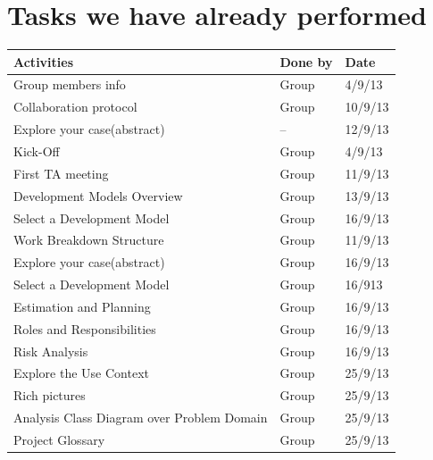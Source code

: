 \renewcommand{\headrulewidth}{0.1pt}
\renewcommand{\footrulewidth}{0.1pt}

\section*{Tasks we have already performed}

{\renewcommand{\arraystretch}{1.5}%
\begin{center}
    \begin{tabular}{ | p{5cm} | p{3cm} | p{5cm} |}
    \hline
	\textbf{Activities} & \textbf{Done by} & \textbf{Date} \\ \hline
	Group members info & Group & 4/9/13 \\ \hline
	Collaboration protocol & Group & 10/9/13 \\ \hline
	Explore your case(abstract) & -- & 12/9/13 \\ \hline
	Kick-Off & Group & 4/9/13 \\ \hline
	First TA meeting & Group & 11/9/13 \\ \hline
	Development Models Overview & Group & 13/9/13 \\ \hline
	Select a Development Model & Group & 16/9/13 \\ \hline
	Work Breakdown Structure & Group & 11/9/13 \\ \hline
	Explore your case(abstract) & Group &  16/9/13 \\ \hline
	Select a Development Model & Group & 16/913 \\ \hline
	Estimation and Planning & Group & 16/9/13 \\ \hline
	Roles and Responsibilities & Group & 16/9/13 \\ \hline
	Risk Analysis & Group & 16/9/13 \\ \hline
	Explore the Use Context & Group & 25/9/13 \\ \hline
	Rich pictures & Group & 25/9/13 \\ \hline
	Analysis Class Diagram over Problem Domain & Group & 25/9/13 \\ \hline
	Project Glossary & Group & 25/9/13 \\ \hline

\end{tabular}
\end{center}}

